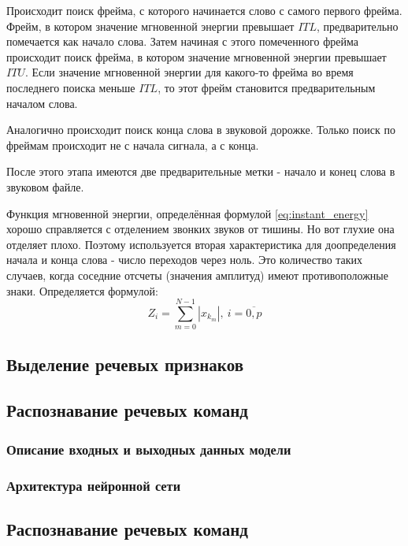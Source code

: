 Происходит поиск фрейма, с которого начинается слово с самого первого фрейма. Фрейм, в котором значение мгновенной энергии превышает $ITL$, предварительно помечается как начало слова. Затем начиная с этого помеченного фрейма происходит поиск фрейма, в котором значение мгновенной энергии превышает $ITU$. Если значение мгновенной энергии для какого-то фрейма во время последнего поиска меньше $ITL$, то этот фрейм становится предварительным началом слова. 

Аналогично происходит поиск конца слова в звуковой дорожке. Только поиск по фреймам происходит не с начала сигнала, а с конца.

После этого этапа имеются две предварительные метки - начало и конец слова в звуковом файле.

Функция мгновенной энергии, определённая формулой \eqref{eq:instant_energy} хорошо справляется с отделением звонких звуков от тишины. Но вот глухие она отделяет плохо. Поэтому используется вторая характеристика для доопределения начала и конца слова - число переходов через ноль. Это количество таких случаев, когда соседние отсчеты (значения амплитуд) имеют противоположные знаки. Определяется формулой:
\begin{equation}
	Z_i = \sum_{m=0}^{N-1} |x_{k_m}|,~i=\overline{0,p}
\end{equation}


\subsection{Выделение речевых признаков}



\subsection{Распознавание речевых команд}
\subsubsection{Описание входных и выходных данных модели}
\subsubsection{Архитектура нейронной сети}
\subsubsection{}


\subsection{Распознавание речевых команд}